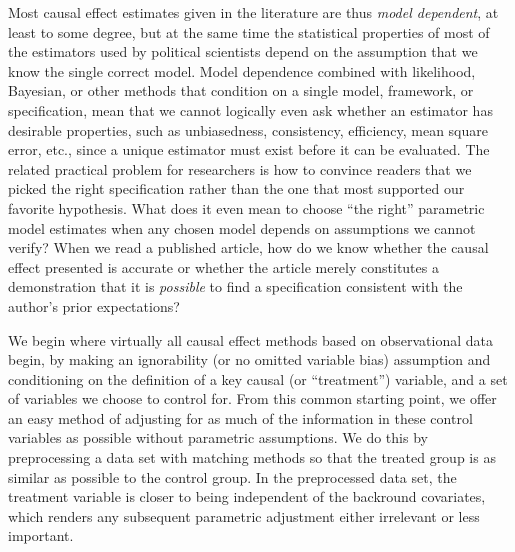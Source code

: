 \documentclass[11pt,titlepage]{article}
\begin{document}
Most causal effect estimates given in the literature are thus
\emph{model dependent}, at least to some degree, but at the same time
the statistical properties of most of the estimators used by political
scientists depend on the assumption that we know the single correct
model.  Model dependence combined with likelihood, Bayesian, or other
methods that condition on a single model, framework, or specification,
mean that we cannot logically even ask whether an estimator has
desirable properties, such as unbiasedness, consistency, efficiency,
mean square error, etc., since a unique estimator must exist before it
can be evaluated.  The related practical problem for researchers is
how to convince readers that we picked the right specification rather
than the one that most supported our favorite hypothesis.  What does
it even mean to choose ``the right'' parametric model estimates when
any chosen model depends on assumptions we cannot verify?  When we
read a published article, how do we know whether the causal effect
presented is accurate or whether the article merely constitutes a
demonstration that it is \emph{possible} to find a specification
consistent with the author's prior expectations?

We begin where virtually all causal effect methods based on
observational data begin, by making an ignorability (or no omitted
variable bias) assumption and conditioning on the definition of a key
causal (or ``treatment'') variable, and a set of variables we choose
to control for.  From this common starting point, we offer an easy
method of adjusting for as much of the information in these control
variables as possible without parametric assumptions.  We do this by
preprocessing a data set with matching methods so that the treated
group is as similar as possible to the control group.  In the
preprocessed data set, the treatment variable is closer to being
independent of the backround covariates, which renders any subsequent
parametric adjustment either irrelevant or less important.
\end{document}
